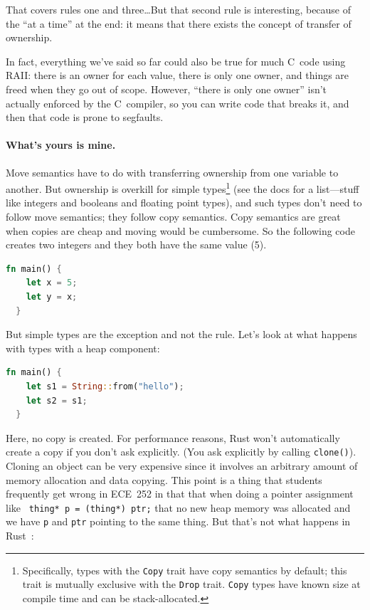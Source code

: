 \documentclass[a4paper]{report}
\newcommand{\CPP}{C\nolinebreak\hspace{-.05em}\raisebox{.4ex}{\tiny\bf +}\nolinebreak\hspace{-.10em}\raisebox{.4ex}{\tiny\bf +}}
\def\CPP{{C\nolinebreak[4]\hspace{-.05em}\raisebox{.4ex}{\tiny\bf ++}}}
\begin{document}
That covers rules one and three\ldots But that second rule is interesting, because of the ``at a time'' at the end: it means that there exists the concept of transfer of ownership.

In fact, everything we've said so far could also be true for much \CPP~code using RAII: there is an owner for each value, there is only one owner, and things are freed when they go out of scope. However, ``there is only one owner'' isn't actually enforced by the \CPP~compiler, so you can write code that breaks it, and then that code is prone to segfaults. 

\paragraph{What's yours is mine.}
Move semantics have to do with transferring ownership from one variable to another. But ownership is overkill for simple types\footnote{Specifically, types with the \texttt{Copy} trait have copy semantics by default; this trait is mutually exclusive with the \texttt{Drop} trait. \texttt{Copy} types have known size at compile time and can be stack-allocated.} (see the docs for a list---stuff like integers and booleans and floating point types), and such types don't need to follow move semantics; they follow copy semantics. Copy semantics are great when copies are cheap and moving would be cumbersome. So the following code creates two integers and they both have the same value (5).

\begin{lstlisting}[language=Rust]
  fn main() {
   	let x = 5;
	let y = x;
  }
\end{lstlisting}

But simple types are the exception and not the rule. Let's look at what happens with types with a heap component:

\begin{lstlisting}[language=Rust]
  fn main() {
    let s1 = String::from("hello");
    let s2 = s1;
  }
\end{lstlisting}

Here, no copy is created. For performance reasons, Rust won't automatically create a copy if you don't ask explicitly. (You ask explicitly by calling \texttt{clone()}). Cloning an object can be very expensive since it involves an arbitrary amount of memory allocation and data copying. This point is a thing that students frequently get wrong in ECE~252 in that that when doing a pointer assignment like \texttt{ thing* p = (thing*) ptr;} that no new heap memory was allocated and we have \texttt{p} and \texttt{ptr} pointing to the same thing. But that's not what happens in Rust~\cite{rustdocs}:
\end{document}
